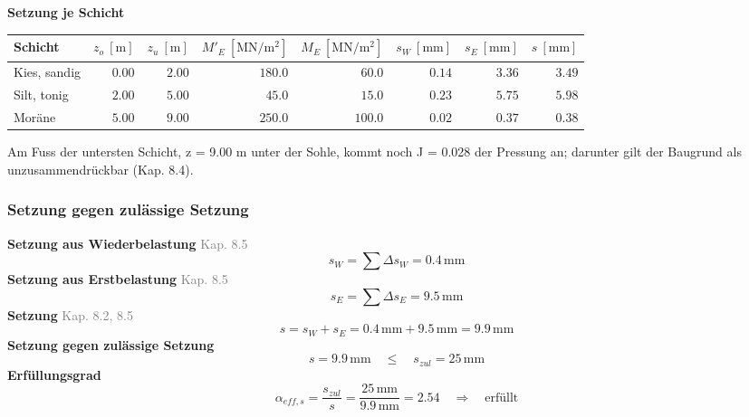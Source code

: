 \documentclass[11pt,a4paper]{article}
\newcommand{\normref}[1]{{\small\textcolor{gray}{#1}}}
\begin{document}
\noindent\textbf{Setzung je Schicht}
\begin{longtable}{lrrrrrrr}
\hline
Schicht & $z_o\ [\mathrm{m}]$ & $z_u\ [\mathrm{m}]$ & $M'_E\ [\mathrm{MN}/\mathrm{m}^{2}]$ & $M_E\ [\mathrm{MN}/\mathrm{m}^{2}]$ & $s_W\ [\mathrm{mm}]$ & $s_E\ [\mathrm{mm}]$ & $s\ [\mathrm{mm}]$ \\
\hline
\endhead
Kies, sandig & $0.00$ & $2.00$ & $180.0$ & $60.0$ & $0.14$ & $3.36$ & $3.49$ \\
Silt, tonig & $2.00$ & $5.00$ & $45.0$ & $15.0$ & $0.23$ & $5.75$ & $5.98$ \\
Moräne & $5.00$ & $9.00$ & $250.0$ & $100.0$ & $0.02$ & $0.37$ & $0.38$ \\
\hline
\end{longtable}
Am Fuss der untersten Schicht, z = 9.00 m unter der Sohle, kommt noch J = 0.028 der Pressung an; darunter gilt der Baugrund als unzusammendrückbar (Kap. 8.4).

\subsubsection{Setzung gegen zulässige Setzung}
\noindent\textbf{Setzung aus Wiederbelastung} \hfill \normref{Kap. 8.5}
\begin{equation*}
s_W = \sum \Delta s_W = 0.4\,\mathrm{mm}
\end{equation*}
\noindent\textbf{Setzung aus Erstbelastung} \hfill \normref{Kap. 8.5}
\begin{equation*}
s_E = \sum \Delta s_E = 9.5\,\mathrm{mm}
\end{equation*}
\noindent\textbf{Setzung} \hfill \normref{Kap. 8.2, 8.5}
\begin{equation*}
s = s_W + s_E = 0.4\,\mathrm{mm} + 9.5\,\mathrm{mm} = 9.9\,\mathrm{mm}
\end{equation*}
\noindent\textbf{Setzung gegen zulässige Setzung}
\begin{equation*}
s = 9.9\,\mathrm{mm} \quad \le \quad s_{zul} = 25\,\mathrm{mm}
\end{equation*}
\noindent\textbf{Erfüllungsgrad}
\begin{equation*}
\alpha_{eff,s} = \frac{s_{zul}}{s} = \frac{25\,\mathrm{mm}}{9.9\,\mathrm{mm}} = 2.54 \quad \Rightarrow \quad \text{erfüllt}
\end{equation*}
\end{document}
